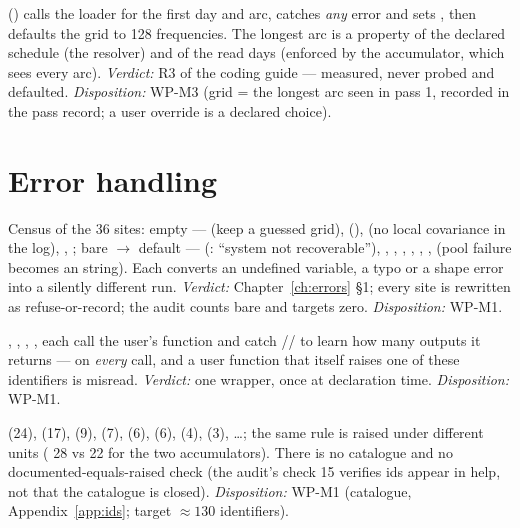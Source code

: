   () calls the loader for the first day and arc, catches \emph{any} error and sets , then defaults the grid to 128 frequencies. The longest arc is a property of the declared schedule (the resolver) and of the read days (enforced by the accumulator, which sees every arc). \textit{Verdict:} R3 of the coding guide --- measured, never probed and defaulted. \textit{Disposition:} WP-M3 (grid = the longest arc seen in pass 1, recorded in the pass record; a user override is a declared choice).

\section*{Error handling}

 Census of the 36  sites: empty ---  (keep a guessed grid),  (),  (no local covariance in the log), , ; bare  $\to$ default ---  (: ``system not recoverable''), , , , , , ,  (pool failure becomes an  string). Each converts an undefined variable, a typo or a shape error into a silently different run. \textit{Verdict:} Chapter~\ref{ch:errors} \S1; every site is rewritten as refuse-or-record; the audit counts bare  and targets zero. \textit{Disposition:} WP-M1.

 , , , ,  each call the user's function and catch // to learn how many outputs it returns --- on \emph{every} call, and a user function that itself raises one of these identifiers is misread. \textit{Verdict:} one wrapper,  once at declaration time. \textit{Disposition:} WP-M1.

  (24),  (17),  (9),  (7),  (6),  (6),  (4),  (3), \ldots; the same rule is raised under different units ( 28 vs  22 for the two accumulators). There is no catalogue and no documented-equals-raised check (the audit's check 15 verifies ids appear in help, not that the catalogue is closed). \textit{Disposition:} WP-M1 (catalogue, Appendix~\ref{app:ids}; target $\approx 130$ identifiers).

